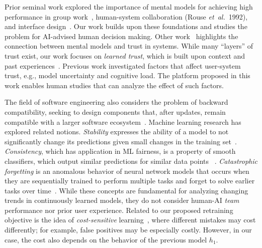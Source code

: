 \documentclass[letterpaper]{article} %
\newcommand{\etal}{\mbox{\it et al.}}
\newcommand{\?}{\mbox{?}}
\newcommand{\name}{AI-advised human decision making}
\newcommand{\hone}{\mbox{$h_1$}}
\begin{document}
Prior seminal work explored the importance of mental models for achieving high performance in group work~\cite{grosz1999evolution}, human-system collaboration (Rouse \etal\ 1992), and interface design~\cite{carroll1988mental}. Our work builds upon these foundations and studies the problem for \name.
Other work~\cite{hoff2015trust} highlights the connection between mental models and trust in systems.
While many ``layers'' of trust exist, our work focuses on {\em learned trust}, which is built upon context and past experiences~\cite{marsh2003role}.
Previous work \cite{zhou2017effects} investigated factors that affect user-system trust, e.g., model uncertainty and cognitive load. The platform proposed in this work enables human studies that can analyze the effect of such factors.


The field of software engineering also considers the problem of backward compatibility, seeking to design components that, after  updates, remain compatible with a larger software ecosystem~\cite{bosch2009software,spring2005techniques,tsantilis2009method}.
Machine learning research has explored related notions. {\em Stability} expresses the ability of a model to not significantly change its predictions given  small changes in the training set~\cite{bousquet2001algorithmic}. {\em Consistency}, which has application in ML fairness, is a property of smooth classifiers, which output similar predictions for similar data points
~\cite{zhou2004learning}. 
\emph{Catastrophic forgetting} is an anomalous behavior of neural network models that occurs when they are sequentially trained to perform multiple tasks and forget to solve earlier tasks over time~\cite{kirkpatrick2017overcoming}. 
While  these concepts are fundamental for analyzing changing trends in continuously learned models, they do not consider human-AI {\em team} performance nor prior user experience. Related to our proposed retraining objective is the idea of \emph{cost-sensitive} learning~\cite{elkan2001foundations}, where different mistakes may cost differently; for example, false positives may be especially costly. However, in our case, the cost also depends on the behavior of the previous model $\hone$.
\end{document}
